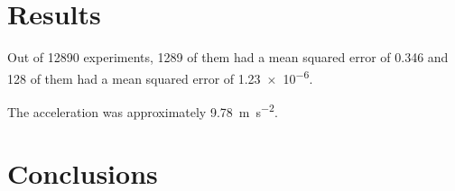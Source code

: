 \documentclass[oneside,12pt]{scrbook}
\theoremstyle{break}
\begin{document}
\chapter{Results}
\label{ch:results}

Out of \num{12890} experiments, \num{1289} of them had a mean
squared error of \num{.346} and \num{128} of them had a mean
squared error of \num{1.23e-6}.

The acceleration was approximately
\SI{9.78}{\metre\per\square\second}.


\chapter{Conclusions}
\label{ch:conc}


\backmatter

\printglossaries

\printbibliography

\printindex
\end{document}
